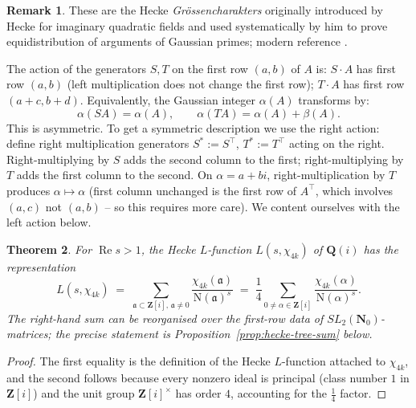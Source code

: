 \documentclass[11pt]{article}
\newtheorem{theorem}{Theorem}[section]
\theoremstyle{definition}
\newtheorem{remark}[theorem]{Remark}
\newcommand{\Nz}{\mathbf{N}_0}
\newcommand{\Z}{\mathbf{Z}}
\newcommand{\Q}{\mathbf{Q}}
\newcommand{\SLNz}{SL_2(\Nz)}
\newcommand{\re}{\operatorname{Re}}
\newcommand{\Norm}{\mathrm{N}}
\begin{document}
\begin{remark}
These are the Hecke \emph{Gr\"ossencharakters} originally introduced by Hecke for imaginary
quadratic fields and used systematically by him \cite{hecke1920} to prove equidistribution
of arguments of Gaussian primes; modern reference \cite[\S 3.8]{IK}.
\end{remark}

The action of the generators $S,T$ on the first row $(a,b)$ of $A$ is:
$S \cdot A$ has first row $(a, b)$ (left multiplication does not change the first row);
$T \cdot A$ has first row $(a+c, b+d)$. Equivalently, the Gaussian integer $\alpha(A)$
transforms by:
\[
  \alpha(SA) = \alpha(A), \qquad \alpha(TA) = \alpha(A) + \beta(A).
\]
This is asymmetric. To get a symmetric description we use the right action: define right
multiplication generators
$S^* := S^\top$, $T^* := T^\top$ acting on the right. Right-multiplying by $S$ adds the
second column to the first; right-multiplying by $T$ adds the first column to the second.
On $\alpha = a+bi$, right-multiplication by $T$ produces $\alpha \mapsto \alpha$ (first
column unchanged is the first row of $A^\top$, which involves $(a,c)$ not $(a,b)$ -- so
this requires more care). We content ourselves with the left action below.

\begin{theorem}\label{thm:hecke-L-as-tree-sum}
For $\re s > 1$, the Hecke $L$-function $L(s,\chi_{4k})$ of $\Q(i)$ has the representation
\[
  L(s,\chi_{4k}) \;=\; \sum_{\mathfrak{a}\subset\Z[i],\, \mathfrak{a}\ne 0}
                        \frac{\chi_{4k}(\mathfrak{a})}{\Norm(\mathfrak{a})^s}
   \;=\; \frac{1}{4} \sum_{0\ne\alpha\in\Z[i]} \frac{\chi_{4k}(\alpha)}{\Norm(\alpha)^s}.
\]
The right-hand sum can be reorganised over the first-row data of $\SLNz$-matrices; the
precise statement is Proposition~\ref{prop:hecke-tree-sum} below.
\end{theorem}

\begin{proof}
The first equality is the definition of the Hecke $L$-function attached to $\chi_{4k}$,
and the second follows because every nonzero ideal is principal (class number $1$ in
$\Z[i]$) and the unit group $\Z[i]^\times$ has order $4$, accounting for the $\tfrac14$
factor.
\end{proof}
\end{document}
